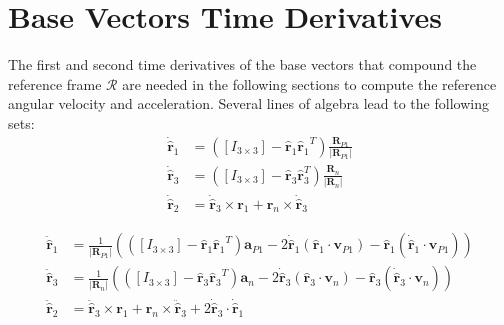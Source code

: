 \section{Base Vectors Time Derivatives}
The first and second time derivatives of the base vectors that compound the reference frame $\mathcal{R}$ are needed in the following sections to compute the reference angular velocity and acceleration. Several lines of algebra lead to the following sets:
\begin{subequations}
	\begin{align}
		\dot{\hat{\bm{r}}}_1 &= ([I_{3\times3}] - {\hat{\bm{r}}_1}{\hat{\bm{r}}_1}^T)  \frac{{\bm R}_{P1}} {|{\bm R}_{P1}|} \\
		\dot{\hat{\bm{r}}}_3 &= ([I_{3\times3}] - \hat{\bm{r}}_3 \hat{\bm{r}}_3^T)  \frac{{\bm R}_{n}} {|{\bm R}_{n}|} \\
		\dot{\hat{\bm{r}}}_2 &= \dot{\hat{\bm{r}}}_3 \times \bm{r}_1 +  \bm{r}_n  \times \dot{\hat{\bm{r}}}_3 
	\end{align}
\end{subequations}

\begin{subequations}
	\begin{align}
		\ddot{\hat{\bm{r}}}_1 &= \frac{1}{|{\bm R}_{P1}|}
		(
		([I_{3\times3}] - {\hat{\bm{r}}_1}{\hat{\bm{r}}_1}^T)  \bm{a}_{P1} - 
		2\dot{\hat{\bm{r}}}_1 (\hat{\bm{r}}_1 \cdot \bm{v}_{P1}) - 
		\hat{\bm{r}}_1 (\dot{\hat{\bm{r}}}_1 \cdot \bm{v}_{P1}) 
		) \\
		\ddot{\hat{\bm{r}}}_3 &= \frac{1}{|{\bm R}_{n}|}
		(
		([I_{3\times3}] - {\hat{\bm{r}}_3}{\hat{\bm{r}}_3}^T)  \bm{a}_{n} - 
		2\dot{\hat{\bm{r}}}_3 (\hat{\bm{r}}_3 \cdot \bm{v}_{n}) - 
		\hat{\bm{r}}_3 (\dot{\hat{\bm{r}}}_3 \cdot \bm{v}_{n}) 
		) \\
		\ddot{\hat{\bm{r}}}_2 &= \ddot{\hat{\bm{r}}}_3 \times \bm{r}_1 +  \bm{r}_n  \times \ddot{\hat{\bm{r}}}_3 + 2\dot{\hat{\bm{r}}}_3 \cdot \dot{\hat{\bm{r}}}_1
	\end{align}
\end{subequations}

